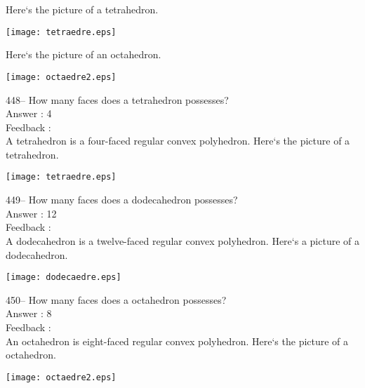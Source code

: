 ﻿\documentclass[letterpaper, 12pt]{article}
\begin{document}
Here`s the picture of a tetrahedron.\\
    \begin{center}
    \texttt{[image: tetraedre.eps]}
    \end{center}
Here`s the picture of an octahedron.\\
    \begin{center}
    \texttt{[image: octaedre2.eps]}
    \end{center}



448--  How many faces does a tetrahedron possesses?\\

Answer : 4\\

Feedback : \\
A tetrahedron is a four-faced regular convex polyhedron.
Here`s the picture of a tetrahedron.\\
    \begin{center}
    \texttt{[image: tetraedre.eps]}
    \end{center}

449--  How many faces does a dodecahedron possesses?\\

Answer : 12\\

Feedback : \\
A dodecahedron is a twelve-faced regular convex polyhedron. Here`s a picture of a dodecahedron.\\
    \begin{center}
    \texttt{[image: dodecaedre.eps]}
    \end{center}


450--  How many faces does a octahedron possesses?\\

Answer : 8\\

Feedback : \\
An octahedron is eight-faced regular convex polyhedron. Here`s the picture of a octahedron.\\
    \begin{center}
    \texttt{[image: octaedre2.eps]}
    \end{center}
\end{document}
